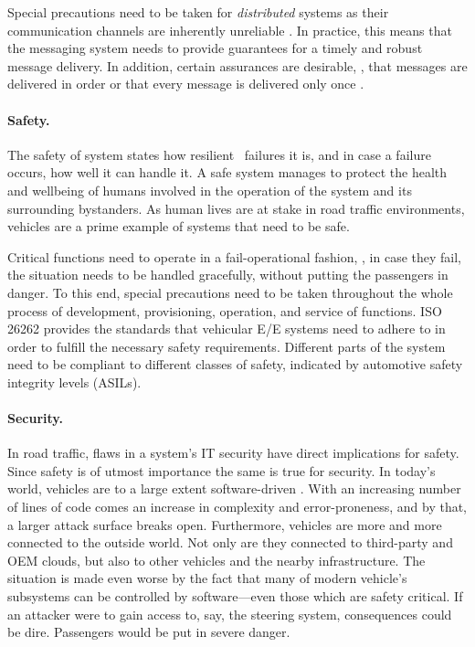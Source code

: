 Special precautions need to be taken for \emph{distributed} systems as their communication channels are inherently unreliable \cite{tanenbaum2017distributed}. In practice, this means that the messaging system needs to provide guarantees for a timely and robust message delivery. In addition, certain assurances are desirable, \eg , that messages are delivered in order or that every message is delivered only once \cite{o2007quality}.

\paragraph{Safety.}
The safety of system states how resilient \wrt\ failures it is, and in case a failure occurs, how well it can handle it. A safe system manages to protect the health and wellbeing of humans involved in the operation of the system and its surrounding bystanders.
As human lives are at stake in road traffic environments, vehicles are a prime example of systems that need to be safe.

Critical functions need to operate in a fail-operational fashion, \ie , in case they fail, the situation needs to be handled gracefully, without putting the passengers in danger. To this end, special precautions need to be taken throughout the whole process of development, provisioning, operation, and service of functions. ISO 26262 \cite{iso201126262} provides the standards that vehicular E/E systems need to adhere to in order to fulfill the necessary safety requirements. Different parts of the system need to be compliant to different classes of safety, indicated by automotive safety integrity levels (ASILs).

\paragraph{Security.}
In road traffic, flaws in a system's IT security have direct implications for safety. Since safety is of utmost importance the same is true for security. In today's world, vehicles are to a large extent software-driven \cite{broy2006challenges}. With an increasing number of lines of code comes an increase in complexity and error-proneness, and by that, a larger attack surface breaks open. Furthermore, vehicles are more and more connected to the outside world. Not only are they connected to third-party and OEM clouds, but also to other vehicles and the nearby infrastructure. The situation is made even worse by the fact that many of modern vehicle's subsystems can be controlled by software---even those which are safety critical.	 If an attacker were to gain access to, say, the steering system, consequences could be dire. Passengers would be put in severe danger.


